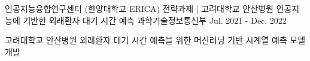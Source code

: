 \begin{cventries}

\cventry
  {인공지능융합연구센터 (한양대학교 ERICA) 전략과제 | \faHospital[regular] 고려대학교 안산병원} %
  {인공지능에 기반한 외래환자 대기 시간 예측} %
  {\faFlask\space 과학기술정보통신부} %
  {Jul. 2021 - Dec. 2022} %
  {
    \begin{cvitems} %
      \item {고려대학교 안산병원 외래환자 대기 시간 예측을 위한 머신러닝 기반 시계열 예측 모델 개발}
    \end{cvitems}
  }

\end{cventries}
